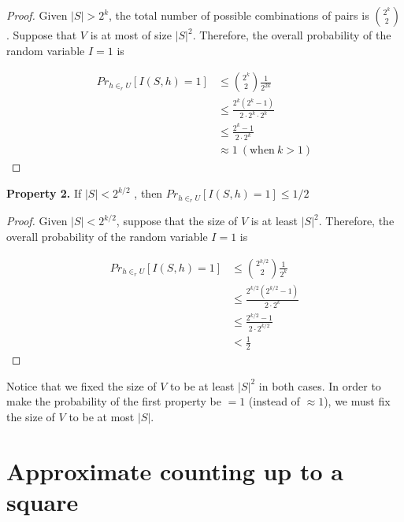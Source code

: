 \documentclass[12pt, a4paper]{article} %
\theoremstyle{definition}
\begin{document}
\begin{proof}


  Given $|S| >  2^k$, the total number of possible combinations of pairs is $\binom{2^k}{2}$.
  Suppose that $V$ is at most of size $|S|^2$.
  Therefore, the overall probability of the random variable $I = 1$ is

  \begin{align*}
    Pr_{h \in_r U} [I(S,h) = 1] &\leq \binom{2^k}{2}\frac{1}{2^{2k}}\\
                                &\leq \frac{2^k(2^k - 1)}{2 \cdot 2^k \cdot 2^k}\\
                                &\leq \frac{2^k - 1}{2 \cdot 2^k}\\
                                &\approx 1 \ (\text{when} \ k > 1)
  \end{align*}

\end{proof}

\textbf{Property 2.} \quad If $|S| < 2^{k/2}$ , then $Pr_{h \in_r U} [I(S,h) = 1] \leq 1/2$

\begin{proof}


  Given $|S| <  2^{k/2}$, suppose that the size of $V$ is at least $|S|^2$.
  Therefore, the overall probability of the random variable $I = 1$ is

  \begin{align*}
    Pr_{h \in_r U} [I(S,h) = 1] &\leq \binom{2^{k/2}}{2}\frac{1}{2^k}\\
                                &\leq \frac{2^{k/2}(2^{k/2} - 1)}{2 \cdot 2^k}\\
                                &\leq \frac{2^{k/2} - 1}{2 \cdot 2^{k/2}}\\
                                &< \frac{1}{2}
  \end{align*}


\end{proof}

Notice that we fixed the size of $V$ to be at least $|S|^2$ in both cases. In order to make the probability of the first property be $= 1$ (instead of $\approx 1$), we must fix the size of $V$ to be at most $|S|$.


\section{Approximate counting up to a square}
\end{document}
